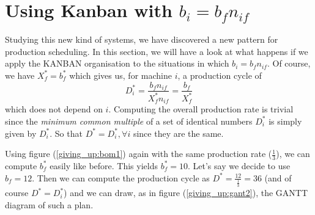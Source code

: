 \section{Using Kanban with $b_i = b_fn_{if}$}

Studying this new kind of systems, we have discovered a new pattern for production scheduling. In this section, we will have a look at what happens if we apply the KANBAN organisation to the situations in which $b_i = b_fn_{if}$. Of course, we have $X_f^* = b_f^*$ which gives us, for machine $i$, a production cycle of \[ D_i^* = \frac{b_fn_{if}}{X_f^*n_{if}} = \frac{b_f}{X_f^*} \] which does not depend on $i$. Computing the overall production rate is trivial since the \emph{minimum common multiple} of a set of identical numbers $D_i^*$ is simply given by $D_i^*$. So that $D^* = D_i^*, \forall i$ since they are the same. 

Using figure (\ref{giving_up:bom1}) again with the same production rate ($\frac{1}{3}$), we can compute $b_f^*$ easily like before. This yields $b_f^* = 10$. Let's say we decide to use $b_f = 12$. Then we can compute the production cycle as $D^* = \frac{12}{\frac{1}{3}} = 36$ (and of course $D^* = D_i^*$) and we can draw, as in figure (\ref{giving_up:gant2}), the GANTT diagram of such a plan. 

